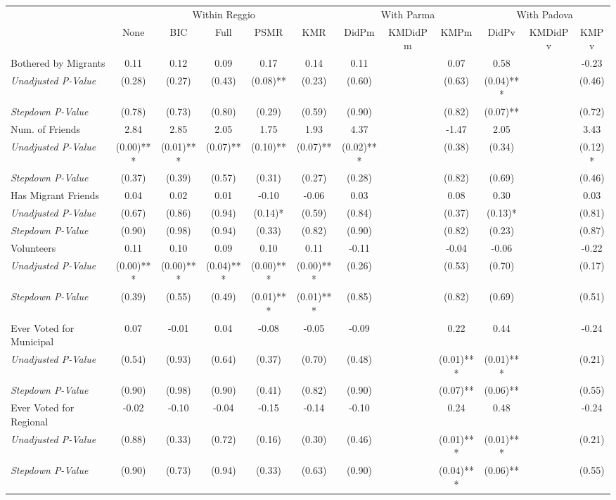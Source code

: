 \begin{tabular}{l c c c c c c c c c c c}
\toprule
& \multicolumn{5}{c}{Within Reggio} & \multicolumn{3}{c}{With Parma} & \multicolumn{3}{c}{With Padova} \\\cmidrule(lr){2-6} \cmidrule(lr){7-9} \cmidrule(lr){10-12}
 & None & BIC & Full & PSMR & KMR & DidPm & KMDidPm & KMPm & DidPv & KMDidPv & KMPv \\
\midrule
Bothered by Migrants & 0.11 & 0.12 & 0.09 & 0.17 & 0.14 & 0.11 & & 0.07 & 0.58 & & -0.23 \\
\quad \textit{Unadjusted P-Value} & (0.28) & (0.27) & (0.43) & (0.08)** & (0.23) & (0.60) & & (0.63) & (0.04)*** & & (0.46) \\
\quad \textit{Stepdown P-Value} & (0.78) & (0.73) & (0.80) & (0.29) & (0.59) & (0.90) & & (0.82) & (0.07)** & & (0.72) \\
Num. of Friends & 2.84 & 2.85 & 2.05 & 1.75 & 1.93 & 4.37 & & -1.47 & 2.05 & & 3.43 \\
\quad \textit{Unadjusted P-Value} & (0.00)*** & (0.01)*** & (0.07)** & (0.10)** & (0.07)** & (0.02)*** & & (0.38) & (0.34) & & (0.12)* \\
\quad \textit{Stepdown P-Value} & (0.37) & (0.39) & (0.57) & (0.31) & (0.27) & (0.28) & & (0.82) & (0.69) & & (0.46) \\
Has Migrant Friends & 0.04 & 0.02 & 0.01 & -0.10 & -0.06 & 0.03 & & 0.08 & 0.30 & & 0.03 \\
\quad \textit{Unadjusted P-Value} & (0.67) & (0.86) & (0.94) & (0.14)* & (0.59) & (0.84) & & (0.37) & (0.13)* & & (0.81) \\
\quad \textit{Stepdown P-Value} & (0.90) & (0.98) & (0.94) & (0.33) & (0.82) & (0.90) & & (0.82) & (0.23) & & (0.87) \\
Volunteers & 0.11 & 0.10 & 0.09 & 0.10 & 0.11 & -0.11 & & -0.04 & -0.06 & & -0.22 \\
\quad \textit{Unadjusted P-Value} & (0.00)*** & (0.00)*** & (0.04)*** & (0.00)*** & (0.00)*** & (0.26) & & (0.53) & (0.70) & & (0.17) \\
\quad \textit{Stepdown P-Value} & (0.39) & (0.55) & (0.49) & (0.01)*** & (0.01)*** & (0.85) & & (0.82) & (0.69) & & (0.51) \\
Ever Voted for Municipal & 0.07 & -0.01 & 0.04 & -0.08 & -0.05 & -0.09 & & 0.22 & 0.44 & & -0.24 \\
\quad \textit{Unadjusted P-Value} & (0.54) & (0.93) & (0.64) & (0.37) & (0.70) & (0.48) & & (0.01)*** & (0.01)*** & & (0.21) \\
\quad \textit{Stepdown P-Value} & (0.90) & (0.98) & (0.90) & (0.41) & (0.82) & (0.90) & & (0.07)** & (0.06)** & & (0.55) \\
Ever Voted for Regional & -0.02 & -0.10 & -0.04 & -0.15 & -0.14 & -0.10 & & 0.24 & 0.48 & & -0.24 \\
\quad \textit{Unadjusted P-Value} & (0.88) & (0.33) & (0.72) & (0.16) & (0.30) & (0.46) & & (0.01)*** & (0.01)*** & & (0.21) \\
\quad \textit{Stepdown P-Value} & (0.90) & (0.73) & (0.94) & (0.33) & (0.63) & (0.90) & & (0.04)*** & (0.06)** & & (0.55) \\
\bottomrule
\end{tabular}
